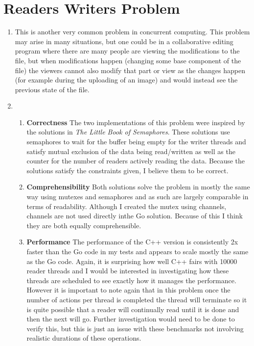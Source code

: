 \documentclass[11pt]{article}
\begin{document}
\section{Readers Writers Problem}
\begin{enumerate}
	\item This is another very common problem in concurrent computing. This problem may arise in many situations, but one could be in a collaborative editing program where there are many people are viewing the modifications to the file, but when modifications happen (changing some base component of the file) the viewers cannot also modify that part or view as the changes happen (for example during the uploading of an image) and would instead see the previous state of the file.

	\item
	\begin{enumerate}
	\item \textbf{Correctness}\linebreak
	The two implementations of this problem were inspired by the solutions in \textit{The Little Book of Semaphores}. These solutions use semaphores to wait for the buffer being empty for the writer threads and satisfy mutual exclusion of the data being read/written as well as the counter for the number of readers actively reading the data. Because the solutions satisfy the constraints given, I believe them to be correct.
	\item \textbf{Comprehensibility}\linebreak
	Both solutions solve the problem in mostly the same way using mutexes and semaphores and as such are largely comparable in terms of readability. Although I created the mutex using channels, channels are not used directly inthe Go solution. Because of this I think they are both equally comprehensible.
	\item \textbf{Performance}\linebreak
	The performance of the C++ version is consistently 2x faster than the Go code in my tests and appears to scale mostly the same as the Go code. Again, it is surprising how well C++ fairs with 10000 reader threads and I would be interested in investigating how these threads are scheduled to see exactly how it manages the performance. However it is important to note again that in this problem once the number of actions per thread is completed the thread will terminate so it is quite possible that a reader will continually read until it is done and then the next will go. Further investigation would need to be done to verify this, but this is just an issue with these benchmarks not involving realistic durations of these operations.
	
	\end{enumerate}
\end{enumerate}
\end{document}
